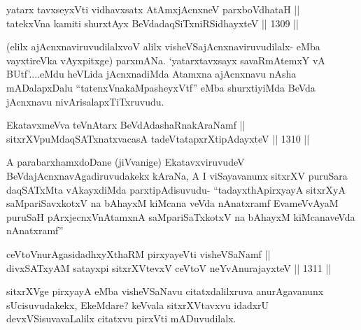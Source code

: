 \begin{shl}
\footnotemark[2]yatarx tavxseyxVti vidhavxsatx AtAmxjAcnxneV parxboVdhataH || \\
tatekxVna kamiti shurxtAyx BeVdadaqSiTxniRSidhayxteV \hfill || 1309 ||  
\end{shl}

\begin{artha}
(elilx ajAcnxnaviruvudilalxvoV alilx visheVSajAcnxnaviruvudilalx- eMba vayxtireVka vAyxpitxge) parxmANa. `yatarxtavxsayx savaRmAtemxY vA BUtf'....eMdu heVLida jAcnxnadiMda Atamxna ajAcnxnavu nAsha mADalapxDalu ``tatenxVnakaMpasheyxVtf'' eMba shurxtiyiMda BeVda jAcnxnavu nivArisalapxTiTxruvudu.
\end{artha}


\begin{shl}
EkatavxmeVva teVnAtarx BeVdAdashaRnakAraNamf || \\
sitxrXVpuMdaqSATxnatxvacasA tadeVtatapxrXtipAdayxteV \hfill || 1310 ||  
\end{shl}

\begin{artha}
A parabarxhamxdoDane (jiVvanige) EkatavxviruvudeV BeVdajAcnxnavAgadiruvudakekx kAraNa, A I viSayavanunx sitxrXV puruSara daqSATxMta vAkayxdiMda parxtipAdisuvudu- ``tadayxthApirxyayA sitxrXyA saMpariSavxkotxV na bAhayxM kiMcana veVda nAnatxramf EvameVvAyaM puruSaH pArxjecnxVnA\s \s tamxnA saMpariSaTxkotxV na bAhayxM kiMcanaveVda nAnatxramf''
\end{artha}


\begin{shl}
ceVtoVnurAgasidadhxyXthaRM pirxyayeVti visheVSaNamf || \\
divxSATxyAM satayxpi sitxrXVtevxV ceVtoV neYvAnurajayxteV \hfill || 1311 ||  
\end{shl}

\begin{artha}
sitxrXVge pirxyayA eMba visheVSaNavu citatxdalilxruva anurAgavanunx sUcisuvudakekx, EkeMdare? keVvala sitxrXVtavxvu idadxrU devxVSisuvavaLalilx citatxvu pirxVti mADuvudilalx.
\end{artha}

